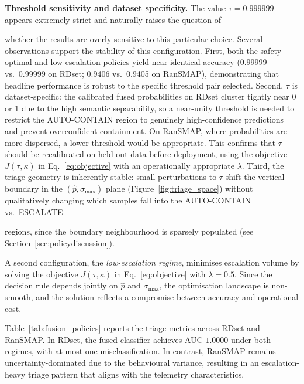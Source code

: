 \documentclass[3p]{elsarticle}
\begin{document}
\begin{changedblock}
\noindent\textbf{Threshold sensitivity and dataset specificity.}
The value $\tau = 0.999999$ appears extremely strict and naturally raises the question of
\end{changedblock}
whether the results are overly sensitive to this particular choice. Several observations
support the stability of this configuration. First, both the safety-optimal and
low-escalation policies yield near-identical accuracy (0.99999 vs.\ 0.99999 on RDset;
0.9406 vs.\ 0.9405 on RanSMAP), demonstrating that headline performance is robust to the
specific threshold pair selected. Second, $\tau$ is dataset-specific: the calibrated fused
probabilities on RDset cluster tightly near 0 or 1 due to the high semantic separability,
so a near-unity threshold is needed to restrict the AUTO-CONTAIN region to genuinely
high-confidence predictions and prevent overconfident containment. On RanSMAP, where
probabilities are more dispersed, a lower threshold would be appropriate. This confirms
that $\tau$ should be recalibrated on held-out data before deployment, using the objective
$J(\tau,\kappa)$ in Eq.~\eqref{eq:objective} with an operationally appropriate $\lambda$.
Third, the triage geometry is inherently stable: small perturbations to $\tau$ shift the
vertical boundary in the $(\hat{p}, \sigma_{\max})$ plane (Figure~\ref{fig:triage_space})
without qualitatively changing which samples fall into the AUTO-CONTAIN vs.\ ESCALATE
\begin{changedblock}
regions, since the boundary neighbourhood is sparsely populated (see Section~\ref{sec:policydiscussion}).
\end{changedblock}

A second configuration, the \emph{low-escalation regime}, minimises escalation volume by
solving the objective $J(\tau,\kappa)$ in Eq.~\eqref{eq:objective} with \(\lambda = 0.5\).
Since the decision rule depends jointly on \(\hat{p}\) and \(\sigma_{\max}\), the optimisation
landscape is non-smooth, and the solution reflects a compromise between accuracy and operational
cost.

Table~\ref{tab:fusion_policies} reports the triage metrics across RDset and RanSMAP. In RDset, the fused classifier achieves AUC \(1.0000\) under both regimes, with at most one misclassification. In contrast, RanSMAP remains uncertainty-dominated due to the behavioural variance, resulting in an escalation-heavy triage pattern that aligns with the telemetry characteristics.
\end{document}
